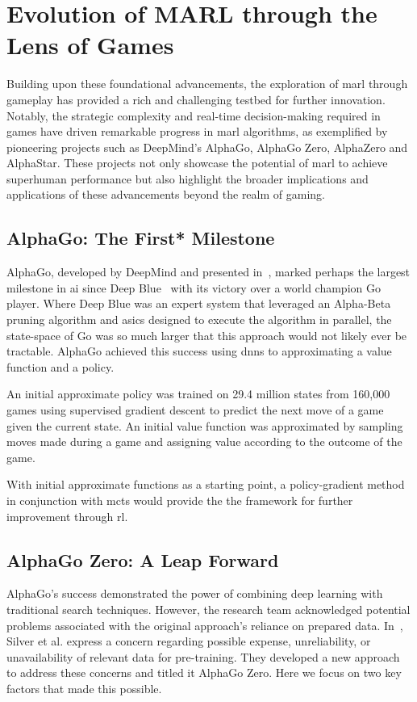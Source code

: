 \section{Evolution of MARL through the Lens of Games}%

Building upon these foundational advancements, the exploration of 
\gls{marl} through gameplay has provided a rich and challenging testbed for further innovation. 
Notably, the strategic complexity and real-time decision-making required in games have driven 
remarkable progress in \gls{marl} algorithms, as exemplified by pioneering projects such as 
DeepMind's AlphaGo\cite{silver2016}, AlphaGo Zero\cite{silver2017},
AlphaZero\cite{silver2017a} and AlphaStar\cite{vinyals2019}. 
These projects not only showcase the potential of \gls{marl} to achieve superhuman performance 
but also highlight the broader implications and applications of these advancements 
beyond the realm of gaming.

\subsection*{AlphaGo: The First* Milestone}
AlphaGo, developed by DeepMind and presented in~\cite{silver2016}, 
marked perhaps the largest milestone in \gls{ai} since Deep Blue~\cite{campbell2002}
with its victory over a world champion Go player.
Where Deep Blue was an expert system that leveraged an Alpha-Beta pruning algorithm
and \glspl{asic} designed to execute the algorithm in parallel,
the state-space of Go was so much larger that this approach would not likely ever be tractable. 
AlphaGo achieved this success using \glspl{dnn} to approximating a value function and a policy.

An initial approximate policy was trained on 29.4 million states from 160,000 games
using supervised gradient descent to predict the next move of a game given the current state.
An initial value function was approximated by sampling moves made during a game
and assigning value according to the outcome of the game.

With initial approximate functions as a starting point,
a policy-gradient method in conjunction with \gls{mcts}
would provide the the framework for further improvement through \gls{rl}.

\subsection*{AlphaGo Zero: A Leap Forward}
AlphaGo's success demonstrated the power of combining deep learning with traditional 
search techniques. However, the research team acknowledged potential problems associated with 
the original approach's reliance on prepared data. 
In~\cite{silver2017}, Silver et al. express a concern regarding 
possible expense, unreliability, or unavailability of relevant data for pre-training.
They developed a new approach to address these concerns and titled it AlphaGo Zero.
Here we focus on two key factors that made this possible.

